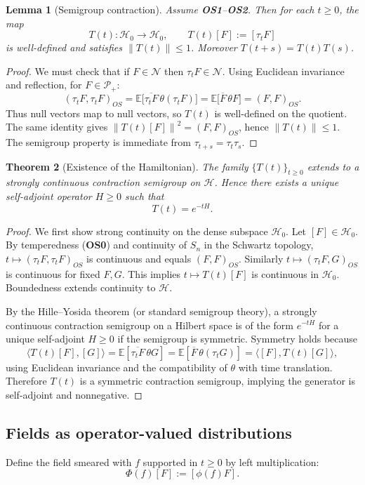 \documentclass[11pt]{article}
\newtheorem{theorem}{Theorem}[section]
\newtheorem{lemma}[theorem]{Lemma}
\theoremstyle{definition}
\newcommand{\E}{\mathbb{E}}
\newcommand{\1}{\mathbf{1}}
\newcommand{\ip}[2]{\langle #1,#2\rangle}
\newcommand{\cH}{\mathcal{H}}
\newcommand{\norm}[1]{\left\lVert#1\right\rVert}
\newcommand{\cP}{\mathcal{P}}
\begin{document}
\begin{lemma}[Semigroup contraction]
Assume \textbf{OS1}--\textbf{OS2}. Then for each \(t\ge 0\), the map
\[
T(t): \cH_0\to \cH_0,\qquad T(t)[F]:=[\tau_t F]
\]
is well-defined and satisfies \(\norm{T(t)}\le 1\). Moreover \(T(t+s)=T(t)T(s)\).
\end{lemma}

\begin{proof}
We must check that if \(F\in\mathcal{N}\) then \(\tau_t F\in\mathcal{N}\). Using Euclidean invariance and reflection, for \(F\in\cP_+\):
\[
(\tau_t F,\tau_t F)_{OS} = \E\big[\overline{\tau_t F}\, \theta(\tau_t F)\big]
= \E\big[\overline{F}\, \theta F\big] = (F,F)_{OS}.
\]
Thus null vectors map to null vectors, so \(T(t)\) is well-defined on the quotient. The same identity gives \(\norm{T(t)[F]}^2=(F,F)_{OS}\), hence \(\norm{T(t)}\le 1\). The semigroup property is immediate from \(\tau_{t+s}=\tau_t\tau_s\).
\end{proof}

\begin{theorem}[Existence of the Hamiltonian]
The family \(\{T(t)\}_{t\ge 0}\) extends to a strongly continuous contraction semigroup on \(\cH\). Hence there exists a unique self-adjoint operator \(H\ge 0\) such that
\[
T(t)=e^{-tH}.
\]
\end{theorem}

\begin{proof}
We first show strong continuity on the dense subspace \(\cH_0\). Let \([F]\in\cH_0\). By temperedness (\textbf{OS0}) and continuity of \(S_n\) in the Schwartz topology, \(t\mapsto (\tau_t F,\tau_t F)_{OS}\) is continuous and equals \((F,F)_{OS}\). Similarly \(t\mapsto (\tau_t F,G)_{OS}\) is continuous for fixed \(F,G\). This implies \(t\mapsto T(t)[F]\) is continuous in \(\cH_0\). Boundedness extends continuity to \(\cH\).

By the Hille--Yosida theorem (or standard semigroup theory), a strongly continuous contraction semigroup on a Hilbert space is of the form \(e^{-tH}\) for a unique self-adjoint \(H\ge 0\) if the semigroup is symmetric. Symmetry holds because
\[
\ip{T(t)[F]}{[G]} = \E[\overline{\tau_t F}\, \theta G]
= \E[\overline{F}\, \theta(\tau_t G)] = \ip{[F]}{T(t)[G]},
\]
using Euclidean invariance and the compatibility of \(\theta\) with time translation. Therefore \(T(t)\) is a symmetric contraction semigroup, implying the generator is self-adjoint and nonnegative.
\end{proof}

\subsection{Fields as operator-valued distributions}
Define the field smeared with \(f\) supported in \(t\ge 0\) by left multiplication:
\[
\Phi(f)[F] := [\phi(f)F].
\]
\end{document}
